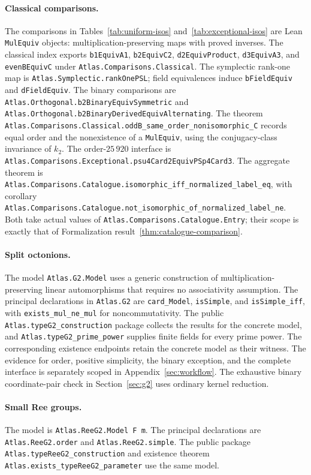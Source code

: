 \documentclass[11pt]{article}
\numberwithin{equation}{section}
\theoremstyle{definition}
\newcommand{\code}[1]{\texttt{\small #1}}
\newcommand{\leanname}[1]{{\small\nolinkurl{#1}}}
\begin{document}
\paragraph{Classical comparisons.}
The comparisons in Tables~\ref{tab:uniform-isos}
and~\ref{tab:exceptional-isos} are Lean \code{MulEquiv} objects:
multiplication-preserving maps with proved inverses. The classical index
exports \code{b1EquivA1}, \code{b2EquivC2}, \code{d2EquivProduct},
\code{d3EquivA3}, and \code{evenBEquivC} under
\leanname{Atlas.Comparisons.Classical}.
The symplectic rank-one map is
\leanname{Atlas.Symplectic.rankOnePSL}; field equivalences induce
\code{bFieldEquiv} and \code{dFieldEquiv}.
The binary comparisons are
\leanname{Atlas.Orthogonal.b2BinaryEquivSymmetric} and
\leanname{Atlas.Orthogonal.b2BinaryDerivedEquivAlternating}.
The theorem
\leanname{Atlas.Comparisons.Classical.oddB_same_order_nonisomorphic_C}
records equal order and the nonexistence of a \code{MulEquiv}, using
the conjugacy-class invariance of $k_2$.
The order-$25\,920$ interface is
\leanname{Atlas.Comparisons.Exceptional.psu4Card2EquivPSp4Card3}.
The aggregate theorem is
\leanname{Atlas.Comparisons.Catalogue.isomorphic_iff_normalized_label_eq},
with corollary
\leanname{Atlas.Comparisons.Catalogue.not_isomorphic_of_normalized_label_ne}.
Both take actual values of \leanname{Atlas.Comparisons.Catalogue.Entry};
their scope is exactly that of Formalization
result~\ref{thm:catalogue-comparison}.

\paragraph{Split octonions.}
The model \leanname{Atlas.G2.Model} uses a generic construction of
multiplication-preserving linear automorphisms that requires no
associativity assumption.
The principal declarations in \leanname{Atlas.G2} are
\code{card\_Model}, \code{isSimple}, and \code{isSimple\_iff},
with \code{exists\_mul\_ne\_mul} for noncommutativity. The public
\leanname{Atlas.typeG2_construction} package collects the results for
the concrete model, and \leanname{Atlas.typeG2_prime_power} supplies
finite fields for every prime power. The corresponding
existence endpoints retain the concrete model as their witness.
The evidence for order, positive simplicity, the binary exception,
and the complete interface is separately scoped in
Appendix~\ref{sec:workflow}.
The exhaustive binary coordinate-pair check in
Section~\ref{sec:g2} uses ordinary kernel reduction.

\paragraph{Small Ree groups.}
The model is \leanname{Atlas.ReeG2.Model F m}.
The principal declarations are \leanname{Atlas.ReeG2.order} and
\leanname{Atlas.ReeG2.simple}. The public package
\leanname{Atlas.typeReeG2_construction} and existence theorem
\leanname{Atlas.exists_typeReeG2_parameter} use the same model.
\end{document}

